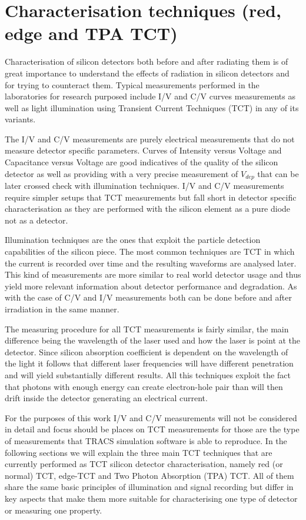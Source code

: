 \chapter{Characterisation techniques (red, edge and TPA TCT)}
\label{sec:tct}

Characterisation of silicon detectors both before and after radiating them is of great importance to understand the effects of radiation in silicon detectors and for trying to counteract them. Typical measurements performed in the laboratories for research purposed include I/V and C/V curves measurements as well as light illumination using Transient Current Techniques (TCT) in any of its variants. 

The I/V and C/V measurements are purely electrical measurements that do not measure detector specific parameters. Curves of Intensity versus Voltage and Capacitance versus Voltage are good indicatives of the quality of the silicon detector as well as providing with a very precise measurement of $V_{dep}$ that can be later crossed check with illumination techniques. I/V and C/V measurements require simpler setups that TCT measurements but fall short in detector specific characterisation as they are performed with the silicon element as a pure diode not as a detector.

Illumination techniques are the ones that exploit the particle detection capabilities of the silicon piece. The most common techniques are TCT in which the current is recorded over time and the resulting waveforms are analysed later. This kind of measurements are more similar to real world detector usage and thus yield more relevant information about detector performance and degradation. As with the case of C/V and I/V measurements both can be done before and after irradiation in the same manner.

The measuring procedure for all TCT measurements is fairly similar, the main difference being the wavelength of the laser used and how the laser is point at the detector. Since silicon absorption coefficient is dependent on the wavelength of the light it follows that different laser frequencies will have different penetration and will yield substantially different results. All this techniques exploit the fact that photons with enough energy can create electron-hole pair than will then drift inside the detector generating an electrical current. 

For the purposes of this work I/V and C/V measurements will not be considered in detail and focus should be places on TCT measurements for those are the type of measurements that TRACS simulation software is able to reproduce. In the following sections we will explain the three main TCT techniques that are currently performed as TCT silicon detector characterisation, namely red (or normal) TCT, edge-TCT and Two Photon Absorption (TPA) TCT. All of them share the same basic principles of illumination and signal recording but differ in key aspects that make them more suitable for characterising one type of detector or measuring one property. 

